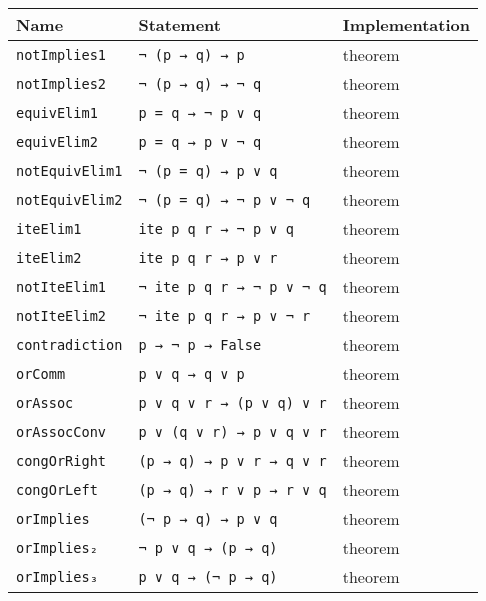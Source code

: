 \documentclass[
	msc,
	english
]{ppgccufmg}
\begin{document}

\begin{longtabu} to \textwidth { l l l }
\toprule
Name        & Statement & Implementation \\ \midrule
\texttt{notImplies1} & \texttt{¬ (p → q) → p} & theorem \\ \midrule
\texttt{notImplies2} & \texttt{¬ (p → q) → ¬ q}      & theorem        \\ \midrule
\texttt{equivElim1}  & \texttt{p = q → ¬ p ∨ q}      & theorem        \\ \midrule
\texttt{equivElim2}  & \texttt{p = q → p ∨ ¬ q}      & theorem        \\ \midrule
\texttt{notEquivElim1}  & \texttt{¬ (p = q) → p ∨ q}  & theorem        \\ \midrule
\texttt{notEquivElim2}  &  \texttt{¬ (p = q) → ¬ p ∨ ¬ q}      & theorem        \\ \midrule
\texttt{iteElim1} & \texttt{ite p q r → ¬ p ∨ q} & theorem \\ \midrule
\texttt{iteElim2} & \texttt{ite p q r → p ∨ r} & theorem \\ \midrule
\texttt{notIteElim1} & \texttt{¬ ite p q r → ¬ p ∨ ¬ q} & theorem \\ \midrule
\texttt{notIteElim2} & \texttt{¬ ite p q r → p ∨ ¬ r} & theorem \\ \midrule
\texttt{contradiction} & \texttt{p → ¬ p → False} & theorem \\ \midrule
\texttt{orComm} & \texttt{p ∨ q → q ∨ p} & theorem \\ \midrule
\texttt{orAssoc} & \texttt{p ∨ q ∨ r → (p ∨ q) ∨ r} & theorem \\ \midrule
\texttt{orAssocConv} & \texttt{p ∨ (q ∨ r) → p ∨ q ∨ r} & theorem \\ \midrule
\texttt{congOrRight} & \texttt{(p → q) → p ∨ r → q ∨ r} & theorem \\ \midrule
\texttt{congOrLeft} & \texttt{(p → q) → r ∨ p → r ∨ q} & theorem \\ \midrule
\texttt{orImplies} & \texttt{(¬ p → q) → p ∨ q} & theorem \\ \midrule
\texttt{orImplies₂} & \texttt{¬ p ∨ q → (p → q)} & theorem \\ \midrule
\texttt{orImplies₃} & \texttt{p ∨ q → (¬ p → q)} & theorem \\ \midrule

\end{longtabu}
\end{document}
